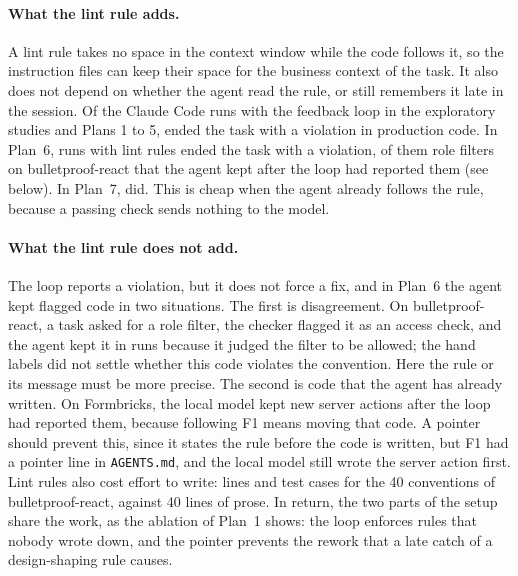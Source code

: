 \documentclass[pdflatex,sn-basic]{sn-jnl}
\newcommand{\file}[1]{\texttt{#1}}
\begin{document}
\paragraph{What the lint rule adds.}
A lint rule takes no space in the context window while the code follows it, so the instruction files can keep their space for the business context of the task.
It also does not depend on whether the agent read the rule, or still remembers it late in the session.
Of the \NLoopRuns{} Claude Code runs with the feedback loop in the exploratory studies and Plans 1 to 5, \NLoopBroken{} ended the task with a violation in production code.
In Plan~6, \HTwelveRules{} runs with lint rules ended the task with a violation, \PSixBPIgnoredRuns{} of them role filters on bulletproof-react that the agent kept after the loop had reported them (see below).
In Plan~7, \HSixteenRules{} did.
This is cheap when the agent already follows the rule, because a passing check sends nothing to the model.

\paragraph{What the lint rule does not add.}
The loop reports a violation, but it does not force a fix, and in Plan~6 the agent kept flagged code in two situations.
The first is disagreement.
On bulletproof-react, a task asked for a role filter, the checker flagged it as an access check, and the agent kept it in \PSixBPIgnoredRuns{} runs because it judged the filter to be allowed; the hand labels did not settle whether this code violates the convention.
Here the rule or its message must be more precise.
The second is code that the agent has already written.
On Formbricks, the local model kept new server actions after the loop had reported them, because following F1 means moving that code.
A pointer should prevent this, since it states the rule before the code is written, but F1 had a pointer line in \file{AGENTS.md}, and the local model still wrote the server action first.
Lint rules also cost effort to write: \PSixBPLOC{} lines and \PSixBPCases{} test cases for the 40 conventions of bulletproof-react, against 40 lines of prose.
In return, the two parts of the setup share the work, as the ablation of Plan~1 shows: the loop enforces rules that nobody wrote down, and the pointer prevents the rework that a late catch of a design-shaping rule causes.
\end{document}
